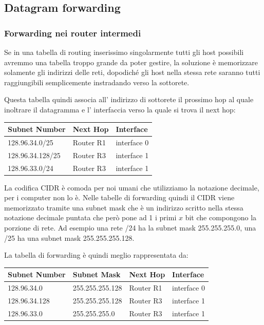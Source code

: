 \subsection{Datagram forwarding}
\subsubsection{Forwarding nei router intermedi}
Se in una tabella di routing inserissimo singolarmente tutti gli host possibili avremmo una tabella troppo grande da poter gestire, la soluzione è memorizzare solamente gli indirizzi delle reti, dopodiché gli host nella stessa rete saranno tutti raggiungibili semplicemente instradando verso la sottorete.

Questa tabella quindi associa all' indirizzo di sottorete il prossimo hop al quale inoltrare il datagramma e l' interfaccia verso la quale si trova il next hop:
\begin{table}[ht!]
    \centering
    \begin{tabular}{l|l|l}
        Subnet Number & Next Hop & Interface \\
        \hline
        128.96.34.0/25 & Router R1 & interface 0 \\
        128.96.34.128/25 & Router R3 & interface 1 \\
        128.96.33.0/24 & Router R3 & interface 1 \\
    \end{tabular}
\end{table}

La codifica CIDR è comoda per noi umani che utilizziamo la notazione decimale, per i computer non lo è.
Nelle tabelle di forwarding quindi il CIDR viene memorizzato tramite una subnet mask che è un indirizzo scritto nella stessa notazione decimale puntata che però pone ad 1 i primi $x$ bit che compongono la porzione di rete.
Ad esempio una rete /24 ha la subnet mask 255.255.255.0, una /25 ha una subnet mask 255.255.255.128.

La tabella di forwarding è quindi meglio rappresentata da:
\begin{table}[ht!]
    \centering
    \begin{tabular}{l|l|l|l}
        Subnet Number & Subnet Mask & Next Hop & Interface \\
        \hline
        128.96.34.0 & 255.255.255.128 & Router R1 & interface 0 \\
        128.96.34.128 & 255.255.255.128 & Router R3 & interface 1 \\
        128.96.33.0 & 255.255.255.0 & Router R3 & interface 1 \\
    \end{tabular}
\end{table}

